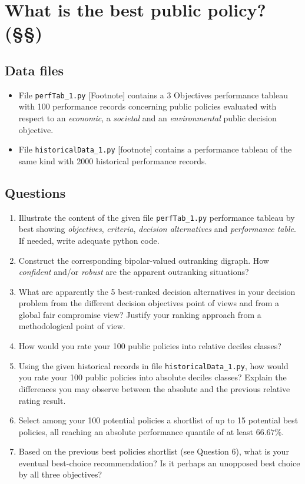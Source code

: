 \section{What is the best public policy? (§§)}
\label{sec:15.4}

\subsection{Data files}
\label{sec:15.4.1}

\begin{itemize}
\item File \texttt{perfTab\_1.py} [Footnote] contains a 3 Objectives performance tableau with 100 performance records concerning public policies evaluated with respect to an \emph{economic}, a \emph{societal} and an \emph{environmental} public decision objective.
\item File \texttt{historicalData\_1.py} [footnote] contains a performance tableau of the same kind with 2000 historical performance records.
\end{itemize}

\subsection{Questions}
\label{sec:15.4.2}

\begin{enumerate}
\item Illustrate the content of the given file \texttt{perfTab\_1.py} performance tableau by best showing \emph{objectives}, \emph{criteria}, \emph{decision alternatives} and \emph{performance table}. If needed, write adequate python code.
\item Construct the corresponding bipolar-valued outranking digraph. How \emph{confident} and/or \emph{robust} are the apparent outranking situations?
\item What are apparently the 5 best-ranked decision alternatives in your decision problem from the different decision objectives point of views and from a global fair compromise view? Justify your ranking approach from a methodological point of view.
\item How would you rate your 100 public policies into relative deciles classes?
\item Using the given historical records in file \texttt{historicalData\_1.py}, how would you rate your 100 public policies into absolute deciles classes? Explain the differences you may observe between the absolute and the previous relative rating result.
\item  Select among your 100 potential policies a shortlist of up to 15 potential best policies,  all reaching an absolute performance quantile of at least $66.67\%$.
\item Based on the previous best policies shortlist (see Question 6), what is your eventual best-choice recommendation? Is it perhaps an unopposed best choice by all three objectives?
\end{enumerate}

